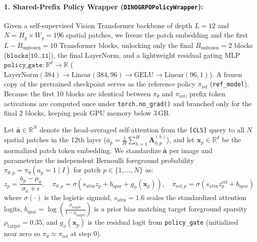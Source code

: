 \documentclass[11pt,a4paper]{article}
\begin{document}
\paragraph{1. Shared-Prefix Policy Wrapper (\texttt{DINOGRPOPolicyWrapper}):}
Given a self-supervised Vision Transformer backbone of depth $L=12$ and $N = H_g \times W_g = 196$ spatial patches, we freeze the patch embedding and the first $L - B_{\text{unfrozen}} = 10$ Transformer blocks, unlocking only the final $B_{\text{unfrozen}} = 2$ blocks ($\texttt{blocks[10..11]}$), the final LayerNorm, and a lightweight residual gating MLP $\texttt{policy\_gate}: \mathbb{R}^d \to \mathbb{R}$ ($\text{LayerNorm}(384) \to \text{Linear}(384, 96) \to \text{GELU} \to \text{Linear}(96, 1)$). A frozen copy of the pretrained checkpoint serves as the reference policy $\pi_{\text{ref}}$ (\texttt{ref\_model}). Because the first 10 blocks are identical between $\pi_\theta$ and $\pi_{\text{ref}}$, prefix token activations are computed once under \texttt{torch.no\_grad()} and branched only for the final 2 blocks, keeping peak GPU memory below 3\,GB.

Let $\bar{\mathbf{a}} \in \mathbb{R}^N$ denote the head-averaged self-attention from the \texttt{[CLS]} query to all $N$ spatial patches in the 12th layer ($\bar{a}_p = \frac{1}{H}\sum_{h=1}^H \mathbf{A}_{0, p}^{(h)}$), and let $\mathbf{x}_p \in \mathbb{R}^d$ be the normalized patch token embedding. We standardize $\bar{\mathbf{a}}$ per image and parameterize the independent Bernoulli foreground probability $\pi_{\theta, p} = \pi_\theta(a_p = 1 \mid I)$ for patch $p \in \{1, \dots, N\}$ as:
\begin{equation}
z_p = \frac{\bar{a}_p - \mu_{\bar{a}}}{\sigma_{\bar{a}} + \epsilon}, \quad
\pi_{\theta, p} = \sigma\!\left(s_{\text{attn}} z_p + b_{\text{spar}} + g_\phi(\mathbf{x}_p)\right), \quad
\pi_{\text{ref}, p} = \sigma\!\left(s_{\text{attn}} z_p^{\text{ref}} + b_{\text{spar}}\right)
\label{eq:grpo_bernoulli_policy}
\end{equation}
where $\sigma(\cdot)$ is the logistic sigmoid, $s_{\text{attn}} = 1.6$ scales the standardized attention logits, $b_{\text{spar}} = \log\!\left(\frac{\rho_{\text{target}}}{1 - \rho_{\text{target}}}\right)$ is a prior bias matching target foreground sparsity $\rho_{\text{target}} = 0.35$, and $g_\phi(\mathbf{x}_p)$ is the residual logit from \texttt{policy\_gate} (initialized near zero so $\pi_\theta \approx \pi_{\text{ref}}$ at step 0).
\end{document}
